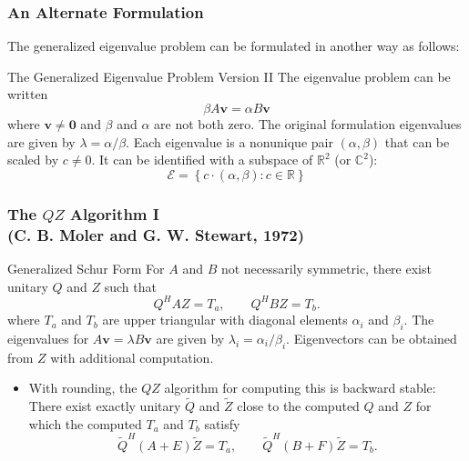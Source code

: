 \documentclass[landscape]{beamer}
\newcommand{\R}{{\mathbb R}}
\newcommand{\C}{{\mathbb C}}
\renewcommand{\vec}[1]{\bm{#1}}
\begin{document}
\begin{frame}
  \frametitle{An Alternate Formulation}
  The generalized eigenvalue problem can be formulated in another way as follows:

  \begin{block}{The Generalized Eigenvalue Problem Version II}
    The eigenvalue problem can be written
    \begin{equation*}
      \beta A \vec{v} = \alpha B \vec{v}
    \end{equation*}
    where $\vec{v} \neq \vec{0}$ and $\beta$ and $\alpha$ are not both
    zero.  The original formulation eigenvalues are given by
    $\lambda = \alpha/\beta$.  Each eigenvalue is a nonunique pair
    $(\alpha, \beta)$ that can be scaled by $c \neq 0$.  It
    can be identified with a subspace of $\R^2$ (or $\C^2$):
    \begin{equation*}
      \mathcal{E} = 
      \left\{ c\cdot (\alpha, \beta) : c \in \R \right\}
    \end{equation*}
  \end{block}
\end{frame}


\begin{frame}
\frametitle{The $QZ$ Algorithm I \\
  (C. B. Moler and G. W. Stewart, 1972)}

\begin{block}{Generalized Schur Form}
  For $A$ and $B$ not necessarily symmetric, there exist unitary $Q$
  and $Z$ such that
  \begin{equation*}
    Q^H A Z = T_a, \qquad
    Q^H B Z = T_b.
  \end{equation*}
  where $T_a$ and $T_b$ are upper triangular with diagonal elements
  $\alpha_i$ and $\beta_i$.  The eigenvalues for
  $A\vec{v} = \lambda B\vec{v}$ are given by
  $\lambda_i = \alpha_{i}/\beta_{i}$.  Eigenvectors can be obtained from $Z$
  with additional computation.
\end{block}

\begin{itemize}
\item With rounding, the $QZ$ algorithm for computing this is backward
  stable: There exist exactly unitary $\tilde{Q}$ and $\tilde{Z}$
  close to the computed $Q$ and $Z$ for which the computed $T_a$ and
  $T_b$ satisfy
  \begin{equation*}
    \tilde{Q}^H (A+E) \tilde{Z} = T_a , \qquad
    \tilde{Q}^H (B+F) \tilde{Z} = T_b.
  \end{equation*}
\end{itemize}
\end{frame}
\end{document}
